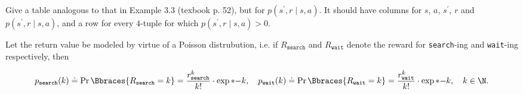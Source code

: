 
\begin{exercise}[Exercise 3.4]

Give a table analogous to that in Example 3.3 (texbook p. 52), but for $p(s^\prime, r \mid s, a)$.
It should have columns for $s$, $a$, $s^\prime$, $r$ and $p(s^\prime, r \mid s, a)$, and a row for every $4$-tuple for which $p(s^\prime, r \mid s, a) > 0$.

\end{exercise}


\begin{solution}

Let the return value be modeled by virtue of a Poisson distrubution, i.e. if $R_\texttt{search}$ and $R_\texttt{wait}$ denote the reward for \texttt{search}-ing and \texttt{wait}-ing respectively, then

\begin{align*}
    p_\texttt{search}(k) \doteq \Pr \Bbraces{R_\texttt{search} = k} = \frac{r_\texttt{search}^k}{k!} \cdot \exp*{-k},
    \quad
    p_\texttt{wait}  (k) \doteq \Pr \Bbraces{R_\texttt{wait}   = k} = \frac{r_\texttt{wait}^k}  {k!} \cdot \exp*{-k},
    \quad
    k \in \N.
\end{align*}


\end{solution}
